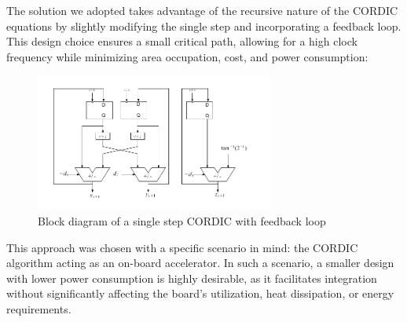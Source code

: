 The solution we adopted takes advantage of the recursive nature of the CORDIC equations by slightly modifying the single step and incorporating a feedback loop. This design choice ensures a small critical path, allowing for a high clock frequency while minimizing area occupation, cost, and power consumption:

\begin{figure}[H]
    \centering
    \includegraphics[width=0.7\textwidth]{images/Architecture/actual_CORDIC.pdf}
    \caption{Block diagram of a single step CORDIC with feedback loop}
    \label{fig:actual_CORDIC}
\end{figure}

This approach was chosen with a specific scenario in mind: the CORDIC algorithm acting as an on-board accelerator. In such a scenario, a smaller design with lower power consumption is highly desirable, as it facilitates integration without significantly affecting the board's utilization, heat dissipation, or energy requirements.

